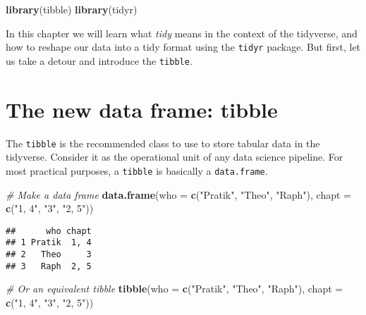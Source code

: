 \documentclass[
]{book}
\newenvironment{Shaded}{}{}
\newcommand{\CommentTok}[1]{\textcolor[rgb]{0.38,0.63,0.69}{\textit{#1}}}
\newcommand{\DataTypeTok}[1]{\textcolor[rgb]{0.56,0.13,0.00}{#1}}
\newcommand{\KeywordTok}[1]{\textcolor[rgb]{0.00,0.44,0.13}{\textbf{#1}}}
\newcommand{\NormalTok}[1]{#1}
\newcommand{\StringTok}[1]{\textcolor[rgb]{0.25,0.44,0.63}{#1}}
\begin{document}
\begin{Shaded}
\begin{Highlighting}[]
\KeywordTok{library}\NormalTok{(tibble)}
\KeywordTok{library}\NormalTok{(tidyr)}
\end{Highlighting}
\end{Shaded}

In this chapter we will learn what \emph{tidy} means in the context of the tidyverse, and how to reshape our data into a tidy format using the \texttt{tidyr} package. But first, let us take a detour and introduce the \texttt{tibble}.

\hypertarget{the-new-data-frame-tibble}{%
\section{The new data frame: tibble}\label{the-new-data-frame-tibble}}

The \texttt{tibble} is the recommended class to use to store tabular data in the tidyverse. Consider it as the operational unit of any data science pipeline. For most practical purposes, a \texttt{tibble} is basically a \texttt{data.frame}.

\begin{Shaded}
\begin{Highlighting}[]
\CommentTok{# Make a data frame}
\KeywordTok{data.frame}\NormalTok{(}\DataTypeTok{who =} \KeywordTok{c}\NormalTok{(}\StringTok{"Pratik"}\NormalTok{, }\StringTok{"Theo"}\NormalTok{, }\StringTok{"Raph"}\NormalTok{), }\DataTypeTok{chapt =} \KeywordTok{c}\NormalTok{(}\StringTok{"1, 4"}\NormalTok{, }\StringTok{"3"}\NormalTok{, }\StringTok{"2, 5"}\NormalTok{))}
\end{Highlighting}
\end{Shaded}

\begin{verbatim}
##      who chapt
## 1 Pratik  1, 4
## 2   Theo     3
## 3   Raph  2, 5
\end{verbatim}

\begin{Shaded}
\begin{Highlighting}[]
\CommentTok{# Or an equivalent tibble}
\KeywordTok{tibble}\NormalTok{(}\DataTypeTok{who =} \KeywordTok{c}\NormalTok{(}\StringTok{"Pratik"}\NormalTok{, }\StringTok{"Theo"}\NormalTok{, }\StringTok{"Raph"}\NormalTok{), }\DataTypeTok{chapt =} \KeywordTok{c}\NormalTok{(}\StringTok{"1, 4"}\NormalTok{, }\StringTok{"3"}\NormalTok{, }\StringTok{"2, 5"}\NormalTok{))}
\end{Highlighting}
\end{Shaded}
\end{document}
